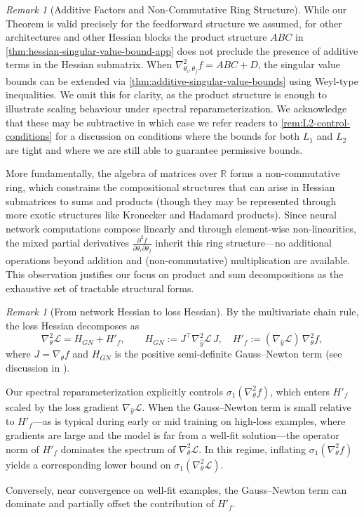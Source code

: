 \documentclass{article}
\theoremstyle{plain}
\theoremstyle{definition}
\theoremstyle{remark}
\newtheorem{remark}[theorem]{Remark}
\begin{document}
\begin{remark}[Additive Factors and Non-Commutative Ring Structure]
\label{remark:additive-ring-structure}
While our Theorem is valid precisely for the feedforward structure we assumed, for other architectures and other Hessian blocks the product structure $ABC$ in \cref{thm:hessian-singular-value-bound-app} does not preclude the presence of additive terms in the Hessian submatrix. When $\nabla^2_{\theta_i, \theta_j} f = ABC + D$, the singular value bounds can be extended via \cref{thm:additive-singular-value-bounds} using Weyl-type inequalities. We omit this for clarity, as the product structure is enough to illustrate scaling behaviour under spectral reparameterization. We acknowledge that these may be subtractive in which case we refer readers to \cref{rem:L2-control-conditions} for a discussion on conditions where the bounds for both $L_1$ and $L_2$ are tight and where we are still able to guarantee permissive bounds.

More fundamentally, the algebra of matrices over $\mathbb{R}$ forms a non-commutative ring, which constrains the compositional structures that can arise in Hessian submatrices to sums and products (though they may be represented through more exotic structures like Kronecker and Hadamard products). Since neural network computations compose linearly and through element-wise non-linearities, the mixed partial derivatives $\frac{\partial^2 f}{\partial \theta_i \partial \theta_j}$ inherit this ring structure---no additional operations beyond addition and (non-commutative) multiplication are available. This observation justifies our focus on product and sum decompositions as the exhaustive set of tractable structural forms.
\end{remark}

\begin{remark}[From network Hessian to loss Hessian]\label{rem:network-to-loss-hessian}
By the multivariate chain rule, the loss Hessian decomposes as
\[
\nabla^2_\theta \mathcal{L}
= H_{GN} + H'_f,
\qquad
H_{GN} := J^\top \nabla^2_{\hat{y}} \mathcal{L}\, J,
\quad
H'_f := (\nabla_{\hat{y}} \mathcal{L}) \, \nabla^2_\theta f,
\]
where $J = \nabla_\theta f$ and $H_{GN}$ is the positive semi-definite Gauss--Newton term (see discussion in \citet{schraudolph2002}).

Our spectral reparameterization explicitly controls $\sigma_1(\nabla^2_\theta f)$, which enters $H'_f$ scaled by the loss gradient $\nabla_{\hat{y}} \mathcal{L}$. When the Gauss--Newton term is small relative to $H'_f$—as is typical during early or mid training on high-loss examples, where gradients are large and the model is far from a well-fit solution—the operator norm of $H'_f$ dominates the spectrum of $\nabla^2_\theta \mathcal{L}$. In this regime, inflating $\sigma_1(\nabla^2_\theta f)$ yields a corresponding lower bound on $\sigma_1(\nabla^2_\theta \mathcal{L})$.

Conversely, near convergence on well-fit examples, the Gauss--Newton term can dominate and partially offset the contribution of $H'_f$.
\end{remark}
\end{document}
